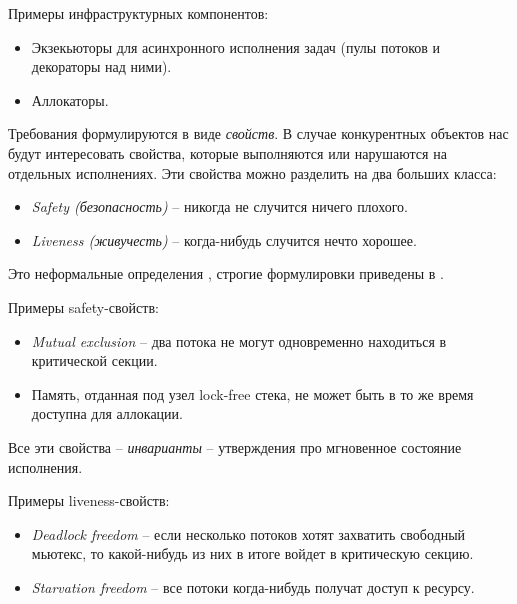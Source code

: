 Примеры инфраструктурных компонентов:

\begin{itemize}

\item	Экзекьюторы для асинхронного исполнения задач (пулы потоков и декораторы над ними).

\item	Аллокаторы.
\end{itemize}

Требования формулируются в виде \emph{свойств}. В случае конкурентных объектов нас будут интересовать свойства, которые выполняются или нарушаются на отдельных исполнениях. Эти свойства можно разделить на два больших класса:

\begin{itemize}
\item	\emph{Safety (безопасность)} – никогда не случится ничего плохого.

\item	\emph{Liveness (живучесть)} – когда-нибудь случится нечто хорошее.
\end{itemize}

Это неформальные определения \autocite{Proving}, строгие формулировки приведены в \autocite{SafetyLiveness}.

Примеры safety-свойств:

\begin{itemize}
\item	\emph{Mutual exclusion} – два потока не могут одновременно находиться в критической секции.

\item	Память, отданная под узел lock-free стека, не может быть в то же время доступна для аллокации.
\end{itemize} 

Все эти свойства – \emph{инварианты} – утверждения про мгновенное состояние исполнения.

Примеры liveness-свойств:

\begin{itemize}

\item	\emph{Deadlock freedom} – если несколько потоков хотят захватить свободный мьютекс, то какой-нибудь из них в итоге войдет в критическую секцию.

\item	\emph{Starvation freedom} – все потоки когда-нибудь получат доступ к ресурсу.

\end{itemize}



